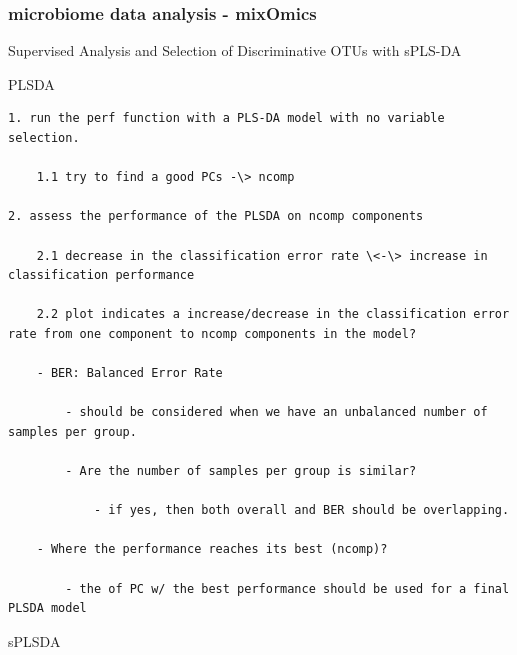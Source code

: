 \documentclass[
]{book}
\begin{document}
\hypertarget{microbiome-data-analysis---mixomics}{%
\subsubsection{microbiome data analysis - mixOmics}\label{microbiome-data-analysis---mixomics}}

Supervised Analysis and Selection of Discriminative OTUs with sPLS-DA

PLSDA

\begin{verbatim}
1. run the perf function with a PLS-DA model with no variable selection.

    1.1 try to find a good PCs -\> ncomp

2. assess the performance of the PLSDA on ncomp components

    2.1 decrease in the classification error rate \<-\> increase in classification performance

    2.2 plot indicates a increase/decrease in the classification error rate from one component to ncomp components in the model?

    - BER: Balanced Error Rate

        - should be considered when we have an unbalanced number of samples per group.

        - Are the number of samples per group is similar?

            - if yes, then both overall and BER should be overlapping.

    - Where the performance reaches its best (ncomp)?

        - the of PC w/ the best performance should be used for a final PLSDA model
\end{verbatim}

sPLSDA
\end{document}
